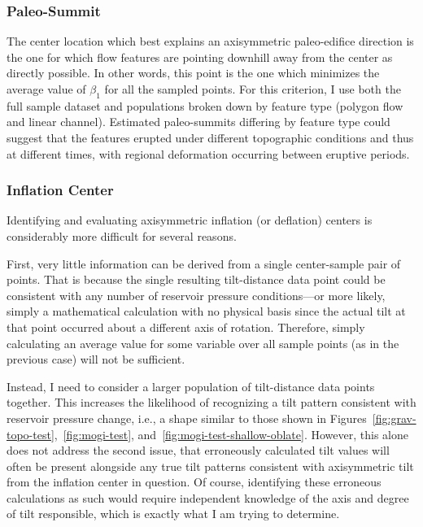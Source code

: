\subsubsection{Paleo-Summit}

The center location which best explains an axisymmetric paleo-edifice direction is the one for which flow features are pointing downhill away from the center as directly possible. In other words, this point is the one which minimizes the average value of $\beta_1$ for all the sampled points. For this criterion, I use both the full sample dataset and populations broken down by feature type (polygon flow and linear channel). Estimated paleo-summits differing by feature type could suggest that the features erupted under different topographic conditions and thus at different times, with regional deformation occurring between eruptive periods.

\subsubsection{Inflation Center}

Identifying and evaluating axisymmetric inflation (or deflation) centers is considerably more difficult for several reasons.

First, very little information can be derived from a single center-sample pair of points. That is because the single resulting tilt-distance data point could be consistent with any number of reservoir pressure conditions---or more likely, simply a mathematical calculation with no physical basis since the actual tilt at that point occurred about a different axis of rotation. Therefore, simply calculating an average value for some variable over all sample points (as in the previous case) will not be sufficient.

Instead, I need to consider a larger population of tilt-distance data points together. This increases the likelihood of recognizing a tilt pattern consistent with reservoir pressure change, i.e., a shape similar to those shown in Figures~\ref{fig:grav-topo-test},~\ref{fig:mogi-test}, and~\ref{fig:mogi-test-shallow-oblate}. However, this alone does not address the second issue, that erroneously calculated tilt values will often be present alongside any true tilt patterns consistent with axisymmetric tilt from the inflation center in question. Of course, identifying these erroneous calculations as such would require independent knowledge of the axis and degree of tilt responsible, which is exactly what I am trying to determine.

